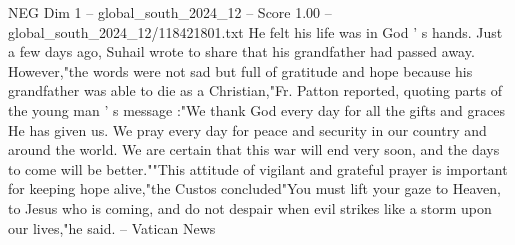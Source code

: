 \begin{textsample}{NEG Dim 1 – global\_south\_2024\_12 – Score 1.00 – global\_south\_2024\_12/118421801.txt}
He felt his life was in God ' s hands.
Just a few days ago, Suhail wrote to share that his grandfather had passed away.
However,"the words were not sad but full of gratitude and hope because his grandfather was able to die as a Christian,"Fr.
Patton reported, quoting parts of the young man ' s message :"We thank God every day for all the gifts and graces He has given us.
We pray every day for peace and security in our country and around the world.
We are certain that this war will end very soon, and the days to come will be better.""This attitude of vigilant and grateful prayer is important for keeping hope alive,"the Custos concluded"You must lift your gaze to Heaven, to Jesus who is coming, and do not despair when evil strikes like a storm upon our lives,"he said. -- Vatican News

\end{textsample}
